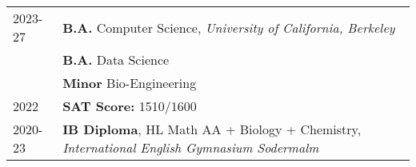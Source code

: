 

\renewcommand{\thefootnote}{\fnsymbol{footnote}}
\setcounter{footnote}{0}

\begin{longtable}[l]{@{}p{} p{}}

    2023-27\footnotemark & \textbf{B.A.} Computer Science, \emph{University of California, Berkeley} \\

    & \textbf{B.A.} Data Science\\

    & \textbf{Minor} Bio-Engineering\\

    2022 & \textbf{SAT Score:} 1510/1600\\

    2020-23 & \textbf{IB Diploma}, HL Math AA + Biology + Chemistry, \emph{International English Gymnasium Sodermalm} \\
\end{longtable}



\renewcommand{\thefootnote}{\arabic{footnote}}
\setcounter{footnote}{1}
